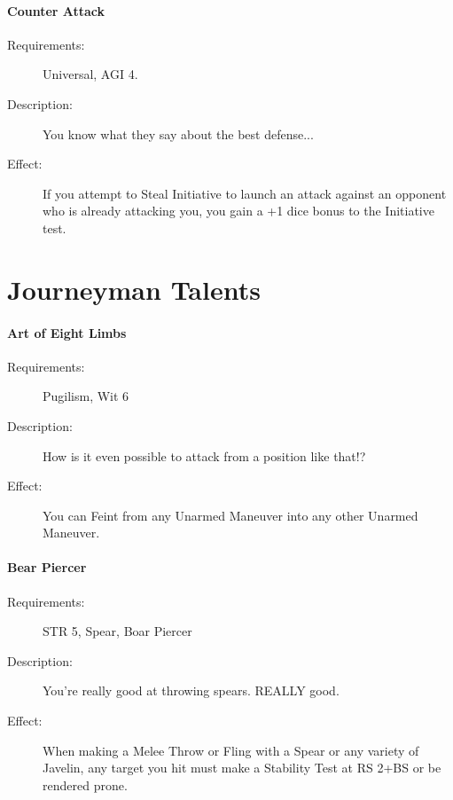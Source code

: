 \documentclass[oneside,11pt,english]{book}
\begin{document}
\paragraph{Counter Attack}\label{talent:Counter Attack}
	\begin{description}
		\item [Requirements:] Universal, AGI 4. 
		\item [Description:] You know what they say about the best defense... 
		\item [Effect:] If you attempt to Steal Initiative to launch an attack against an opponent who is already attacking you, you gain a +1 dice bonus to the Initiative test.
	\end{description}

\section{Journeyman Talents}\label{sec:Journeyman Talents}
\paragraph{\label{talent:Art of Eight Limbs}Art of Eight Limbs}
	\begin{description}
		\item [Requirements:] Pugilism, Wit 6 
		\item [Description:] How is it even possible to attack from a position like that!? 
		\item [Effect:] You can Feint from any Unarmed Maneuver into any other Unarmed Maneuver. 
	\end{description}
	
\paragraph{\label{talent:Bear Piercer}Bear Piercer}
	\begin{description}
		\item [Requirements:] STR 5, Spear, Boar Piercer 
		\item [Description:] You’re really good at throwing spears. REALLY good. 
		\item [Effect:] When making a Melee Throw or Fling with a Spear or any variety of Javelin, any target you hit must make a Stability Test at RS 2+BS or be rendered prone. 
	\end{description}
	
\end{document}
